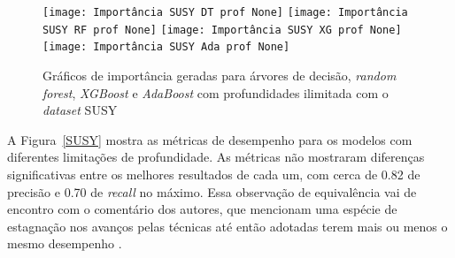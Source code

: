 \documentclass[12pt]{article}
\begin{document}

\begin{figure}[htb]
\centering
\texttt{[image: Importância SUSY DT prof None]}
\texttt{[image: Importância SUSY RF prof None]}
\texttt{[image: Importância SUSY XG prof None]}
\texttt{[image: Importância SUSY Ada prof None]}
\caption{Gráficos de importância geradas para árvores de decisão, \textit{random forest}, \textit{XGBoost} e \textit{AdaBoost} com profundidades ilimitada com o \textit{dataset} SUSY}
\label{impSUSY}
\end{figure}



A Figura~\ref{SUSY} mostra as métricas de desempenho para os modelos com diferentes limitações de profundidade.
As métricas não mostraram diferenças significativas entre os melhores resultados de cada um, com cerca de 0.82 de precisão e 0.70 de \textit{recall} no máximo.
Essa observação de equivalência vai de encontro com o comentário dos autores, que mencionam uma espécie de estagnação nos avanços pelas técnicas até então adotadas terem mais ou menos o mesmo desempenho \cite{Baldi_2014}.
\end{document}
